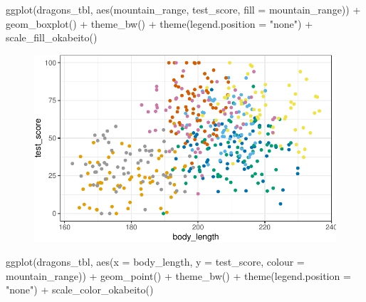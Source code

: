 \documentclass[
  letterpaper,
]{scrbook}
\newenvironment{Shaded}{\begin{snugshade}}{\end{snugshade}}
\newcommand{\AttributeTok}[1]{\textcolor[rgb]{0.40,0.45,0.13}{#1}}
\newcommand{\FunctionTok}[1]{\textcolor[rgb]{0.28,0.35,0.67}{#1}}
\newcommand{\NormalTok}[1]{\textcolor[rgb]{0.00,0.23,0.31}{#1}}
\newcommand{\SpecialCharTok}[1]{\textcolor[rgb]{0.37,0.37,0.37}{#1}}
\newcommand{\StringTok}[1]{\textcolor[rgb]{0.13,0.47,0.30}{#1}}
\begin{document}
\begin{Shaded}
\begin{Highlighting}[]
\FunctionTok{ggplot}\NormalTok{(dragons\_tbl, }\FunctionTok{aes}\NormalTok{(mountain\_range, test\_score, }\AttributeTok{fill =}\NormalTok{ mountain\_range)) }\SpecialCharTok{+}
  \FunctionTok{geom\_boxplot}\NormalTok{() }\SpecialCharTok{+}
  \FunctionTok{theme\_bw}\NormalTok{() }\SpecialCharTok{+}
  \FunctionTok{theme}\NormalTok{(}\AttributeTok{legend.position =} \StringTok{"none"}\NormalTok{) }\SpecialCharTok{+}
  \FunctionTok{scale\_fill\_okabeito}\NormalTok{()}
\end{Highlighting}
\end{Shaded}

\begin{figure}[H]

{\centering \includegraphics{./stat-modeling-mixed_files/figure-pdf/unnamed-chunk-10-1.pdf}

}

\end{figure}

\begin{Shaded}
\begin{Highlighting}[]
\FunctionTok{ggplot}\NormalTok{(dragons\_tbl, }\FunctionTok{aes}\NormalTok{(}\AttributeTok{x =}\NormalTok{ body\_length, }\AttributeTok{y =}\NormalTok{ test\_score, }\AttributeTok{colour =}\NormalTok{ mountain\_range)) }\SpecialCharTok{+}
  \FunctionTok{geom\_point}\NormalTok{() }\SpecialCharTok{+}
  \FunctionTok{theme\_bw}\NormalTok{() }\SpecialCharTok{+}
  \FunctionTok{theme}\NormalTok{(}\AttributeTok{legend.position =} \StringTok{"none"}\NormalTok{) }\SpecialCharTok{+}
  \FunctionTok{scale\_color\_okabeito}\NormalTok{()}
\end{Highlighting}
\end{Shaded}
\end{document}
